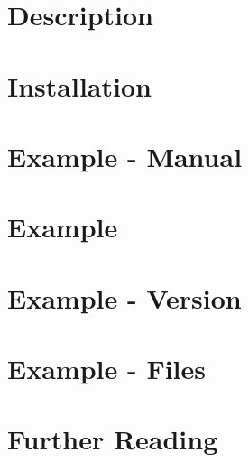 \section{Description}


\section{Installation}



\section{Example - Manual}

\section{Example}

\section{Example - Version}

\section{Example - Files}




\section{Further Reading}

\nocite{Abadi:2016}

   \printbibliography[heading=subbibliography, segment=\therefsegment]










